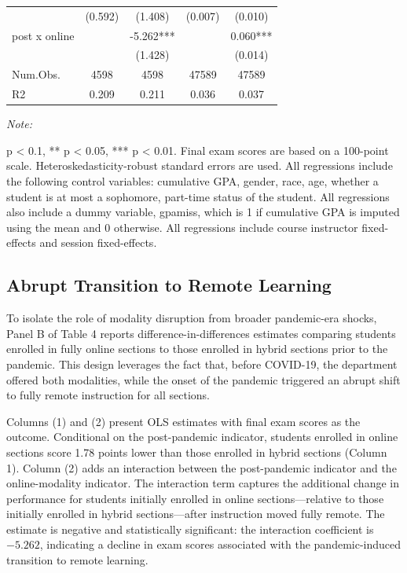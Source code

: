 \documentclass[
  12pt,
  letterpaper,
  DIV=11,
  numbers=noendperiod]{scrartcl}
\begin{document}
\begin{table}[H]
{\begin{threeparttable}
\begin{tabular}[t]{>{\raggedright\arraybackslash}p{15em}cccc}
\hspace{1em} & (0.592) & (1.408) & (0.007) & (0.010)\\
\hspace{1em}post x online &  & -5.262*** &  & 0.060***\\
\hspace{1em} &  & (1.428) &  & (0.014)\\
\hspace{1em}Num.Obs. & 4598 & 4598 & 47589 & 47589\\
\hspace{1em}R2 & 0.209 & 0.211 & 0.036 & 0.037\\
\bottomrule
\end{tabular}
\begin{tablenotes}[para]
\item \textit{Note: } 
\item * p < 0.1, ** p < 0.05, *** p < 0.01. Final exam scores are based on a 100-point scale. Heteroskedasticity-robust standard errors are used. All regressions include the following control variables: cumulative GPA, gender, race, age, whether a student is at most a sophomore, part-time status of the student. All regressions also include a dummy variable, gpamiss, which is 1 if cumulative GPA is imputed using the mean and 0 otherwise. All regressions include course instructor fixed-effects and session fixed-effects.
\end{tablenotes}
\end{threeparttable}}
\endgroup{}
\end{table}

\subsection{Abrupt Transition to Remote
Learning}\label{abrupt-transition-to-remote-learning}

To isolate the role of modality disruption from broader pandemic-era
shocks, Panel B of Table 4 reports difference-in-differences estimates
comparing students enrolled in fully online sections to those enrolled
in hybrid sections prior to the pandemic. This design leverages the fact
that, before COVID-19, the department offered both modalities, while the
onset of the pandemic triggered an abrupt shift to fully remote
instruction for all sections.

Columns (1) and (2) present OLS estimates with final exam scores as the
outcome. Conditional on the post-pandemic indicator, students enrolled
in online sections score 1.78 points lower than those enrolled in hybrid
sections (Column 1). Column (2) adds an interaction between the
post-pandemic indicator and the online-modality indicator. The
interaction term captures the additional change in performance for
students initially enrolled in online sections---relative to those
initially enrolled in hybrid sections---after instruction moved fully
remote. The estimate is negative and statistically significant: the
interaction coefficient is \(-5.262\), indicating a decline in exam
scores associated with the pandemic-induced transition to remote
learning.
\end{document}
